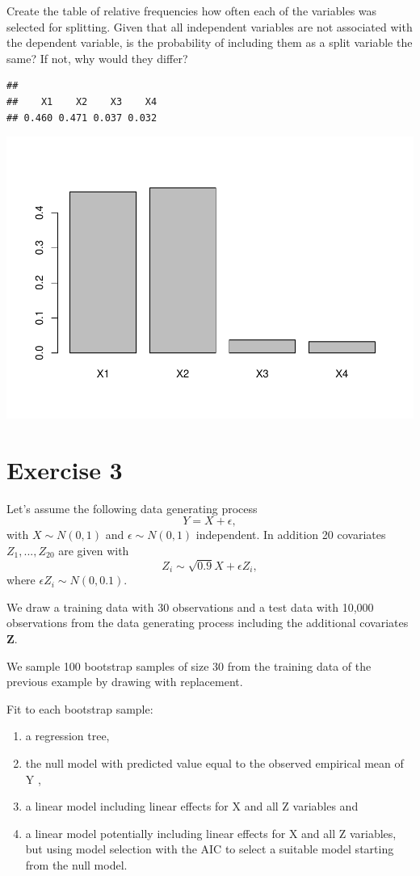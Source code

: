 \documentclass[
]{article}
\begin{document}
Create the table of relative frequencies how often each of the variables
was selected for splitting. Given that all independent variables are not
associated with the dependent variable, is the probability of including
them as a split variable the same? If not, why would they differ?

\begin{verbatim}
## 
##    X1    X2    X3    X4 
## 0.460 0.471 0.037 0.032
\end{verbatim}

\includegraphics{A3_files/figure-latex/unnamed-chunk-10-1.pdf}

\section{Exercise 3}\label{exercise-3}

Let's assume the following data generating process
\[ Y = X + \epsilon, \] with \(X \sim N(0,1)\) and
\(\epsilon \sim N(0,1)\) independent. In addition 20 covariates
\(Z_1, ... ,Z_{20}\) are given with
\[Z_i \sim \sqrt{0.9}X + \epsilon Z_i ,\] where
\(\epsilon Z_i \sim N(0, 0.1).\)

We draw a training data with 30 observations and a test data with 10,000
observations from the data generating process including the additional
covariates \textbf{Z}.

We sample 100 bootstrap samples of size 30 from the training data of the
previous example by drawing with replacement.

Fit to each bootstrap sample:

\begin{enumerate}
\item a regression tree,
\item the null model with predicted value equal to the observed empirical mean of Y ,
\item a linear model including linear effects for X and all Z variables and
\item a linear model potentially including linear effects for X and all Z variables, but using model selection
with the AIC to select a suitable model starting from the null model.
\end{enumerate}
\end{document}
